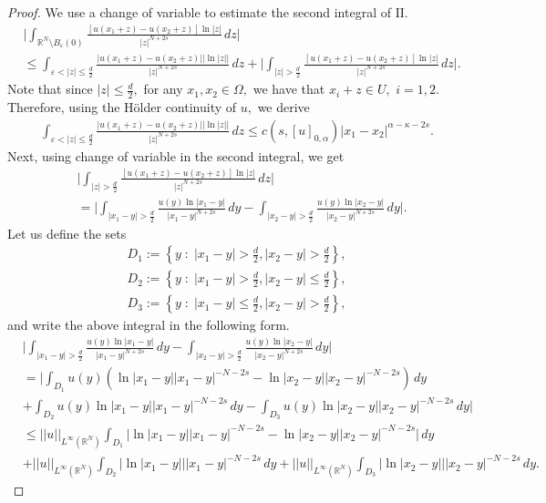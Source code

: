 \documentclass[notitlepage,11pt,reqno]{amsart}
\theoremstyle{definition}
\numberwithin{equation}{section}
\newcommand{\RR}{\mathds{R}}
\begin{document}
\begin{proof}
We use a change of variable to estimate the second integral of $\mathrm {II}.$ 
\begin{align*}
&\Bigg|\int_{\RR^N\setminus B_{\varepsilon}(0)}\frac{[u(x_1+z)-u(x_2+z)]\ln |z|}{|z|^{N+2s}}\, dz\bigg|\\
&\le \int_{\varepsilon< |z|\leq \frac{d}{2}}\frac{|u(x_1+z)-u(x_2+z)||\ln |z||}{|z|^{N+2s}}\, dz+\bigg|\int_{|z|>\frac{d}{2}}\frac{[u(x_1+z)-u(x_2+z)]\ln |z|}{|z|^{N+2s}}\, dz\bigg|.
\end{align*}
Note that since $|z|\leq \frac{d}{2},$ for any $x_1, x_2\in \Omega,$ we have that $x_i+z\in U, $ $i=1,2.$ Therefore, using the H\"older continuity of $u, $ we derive
\begin{align*}
 \int_{\varepsilon< |z|\leq \frac{d}{2}}\frac{|u(x_1+z)-u(x_2+z)||\ln |z||}{|z|^{N+2s}}\, dz\leq c(s, [u]_{0, \alpha})|x_1-x_2|^{\alpha-\kappa-2s}.   
\end{align*}
Next, using change of variable in the second integral, we get
\begin{align*}
&\bigg|\int_{|z|>\frac{d}{2}}\frac{[u(x_1+z)-u(x_2+z)]\ln |z|}{|z|^{N+2s}}\, dz\bigg|\\
&=\bigg| \int_{|x_1-y|>\frac{d}{2}}\frac{u(y)\ln |x_1-y|}{|x_1-y|^{N+2s}}\, dy-\int_{|x_2-y|>\frac{d}{2}}\frac{u(y)\ln |x_2-y|}{|x_2-y|^{N+2s}}\, dy\bigg|.
\end{align*}
Let us define the sets
\begin{align*}
    D_1:=\left\{y\;:\; |x_1-y|> \frac{d}{2}, |x_2-y|> \frac{d}{2}\right\},\\
    D_2:=\left\{y\;:\; |x_1-y|> \frac{d}{2}, |x_2-y|\leq \frac{d}{2}\right\},\\
    D_3:=\left\{y\;:\; |x_1-y|\leq \frac{d}{2}, |x_2-y|> \frac{d}{2}\right\},
\end{align*}
and write the above integral in the following form.
\begin{align*}
&\bigg| \int_{|x_1-y|>\frac{d}{2}}\frac{u(y)\ln |x_1-y|}{|x_1-y|^{N+2s}}\, dy-\int_{|x_2-y|>\frac{d}{2}}\frac{u(y)\ln |x_2-y|}{|x_2-y|^{N+2s}}\, dy\bigg|\\
&=\Bigg|\int_{D_1}u(y)(\ln|x_1-y||x_1-y|^{-N-2s}-\ln |x_2-y||x_2-y|^{-N-2s})\, dy\\
&+\int_{D_2}u(y)\ln |x_1-y||x_1-y|^{-N-2s}\, dy-\int_{D_3}u(y)\ln |x_2-y||x_2-y|^{-N-2s}\, dy\Bigg|\\
&\leq||u||_{L^{\infty}(\RR^N)}\int_{D_1}\Big|\ln |x_1-y||x_1-y|^{-N-2s}-\ln |x_2-y||x_2-y|^{-N-2s}\Big|\, dy\\
&+ ||u||_{L^{\infty}(\RR^N)}\int_{D_2}|\ln |x_1-y|||x_1-y|^{-N-2s}\, dy+||u||_{L^{\infty}(\RR^N)}\int_{D_3}|\ln |x_2-y|||x_2-y|^{-N-2s}\, dy.

\end{align*}
\end{proof}
\end{document}
